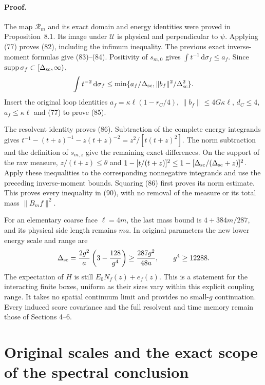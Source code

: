 \documentclass[11pt]{article}
\newcommand{\dd}{\,\mathrm d}
\begin{document}
\paragraph{Proof.}
The map $\mathcal R_m$ and its exact domain and energy identities
were proved in Proposition~8.1. Its image under
$\mathcal U$ is physical and perpendicular to $\psi$. Applying
(77) proves (82), including
the infimum inequality. The previous exact inverse-moment formulas
give (83)--(84).
Positivity of $s_{m,0}$ gives
$\int t^{-1}\dd\sigma_f\leq a_f$. Since
$\operatorname{supp}\sigma_f\subset[\Delta_{\rm sc},\infty)$,
\[
 \int t^{-2}\dd\sigma_f\leq
 \min\{a_f/\Delta_{\rm sc},\|b_f\|^2/\Delta_{\rm sc}^2\}.
\]
Insert the original loop identities $a_f=\kappa\ell(1-r_C/4)$,
$\|b_f\|\leq4G\kappa\ell$, $d_C\leq4$, $a_f\leq\kappa\ell$
and (77) to prove (85).

The resolvent identity proves (86). Subtraction
of the complete energy integrands gives
$t^{-1}-(t+z)^{-1}-z(t+z)^{-2}=z^2/[t(t+z)^2]$.
The norm subtraction and the definition of $s_{m,z}$ give the
remaining exact differences. On the support of the raw measure,
$z/(t+z)\leq\theta$ and
$1-[t/(t+z)]^2\leq1-[\Delta_{\rm sc}/(\Delta_{\rm sc}+z)]^2$.
Apply these inequalities to the corresponding nonnegative
integrands and use the preceding inverse-moment bounds. Squaring
(86) first proves its norm estimate. This proves
every inequality in (90), with no removal
of the measure or its total mass $\|B_mf\|^2$.



For an elementary coarse face $\ell=4m$, the last mass bound is
$4+384m/287$, and its physical side length remains $ma$.
In original parameters the new lower energy scale and range are
\[
 \Delta_{\rm sc}=\frac{2g^2}{a}\left(3-\frac{128}{g^4}\right)
 \geq\frac{287g^2}{48a},\qquad g^4\geq12288.
\]
The expectation of $H$ is still $E_0N_f(z)+e_f(z)$.
This is a statement for the interacting finite boxes, uniform as
their sizes vary within this explicit coupling range. It takes no
spatial continuum limit and provides no small-$g$ continuation.
Every induced score covariance and the full resolvent and time memory
remain those of Sections 4--6.


\section{Original scales and the exact scope of the spectral conclusion}
\end{document}
